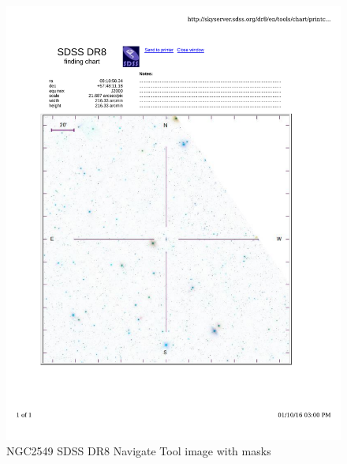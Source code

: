 \documentclass[10pt,letterpaper]{article}
\begin{document}
\begin{figure}[h!]
\centering
\includegraphics[scale=0.7]{figures/NGC2549.pdf}
\caption{NGC2549 SDSS DR8 Navigate Tool image with masks}
\end{figure}
\end{document}
